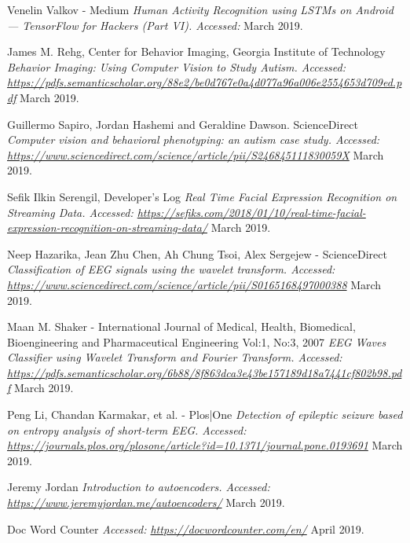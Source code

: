 \begin{thebibliography}{1}
 Venelin Valkov - Medium {\em Human Activity Recognition using LSTMs on Android — TensorFlow for Hackers (Part VI). Accessed:  } March 2019.

 James M. Rehg, Center for Behavior Imaging, Georgia Institute of Technology {\em Behavior Imaging: Using Computer Vision to Study Autism. Accessed:  \url{https://pdfs.semanticscholar.org/88e2/be0d767e0a4d077a96a006e2554653d709ed.pdf}} March 2019.

 Guillermo Sapiro, Jordan Hashemi and Geraldine Dawson. ScienceDirect {\em Computer vision and behavioral phenotyping: an autism case study. Accessed:  \url{https://www.sciencedirect.com/science/article/pii/S246845111830059X}} March 2019.

 Sefik Ilkin Serengil, Developer's Log {\em Real Time Facial Expression Recognition on Streaming Data. Accessed:  \url{https://sefiks.com/2018/01/10/real-time-facial-expression-recognition-on-streaming-data/}} March 2019.

 Neep Hazarika, Jean Zhu Chen, Ah Chung Tsoi, Alex Sergejew - ScienceDirect {\em Classification of EEG signals using the wavelet transform. Accessed:  \url{https://www.sciencedirect.com/science/article/pii/S0165168497000388}} March 2019.

 Maan M. Shaker - International Journal of Medical, Health, Biomedical, Bioengineering and Pharmaceutical Engineering Vol:1, No:3, 2007 {\em EEG Waves Classifier using Wavelet Transform
and Fourier Transform. Accessed:  \url{https://pdfs.semanticscholar.org/6b88/8f863dca3e43be157189d18a7441cf802b98.pdf}} March 2019.

 Peng Li, Chandan Karmakar, et al.  - Plos|One {\em Detection of epileptic seizure based on entropy analysis of short-term EEG. Accessed:  \url{https://journals.plos.org/plosone/article?id=10.1371/journal.pone.0193691}} March 2019.

 Jeremy Jordan {\em Introduction to autoencoders. Accessed:  \url{https://www.jeremyjordan.me/autoencoders/}} March 2019.

 Doc Word Counter {\em Accessed:  \url{https://docwordcounter.com/en/}} April 2019.

\end{thebibliography}